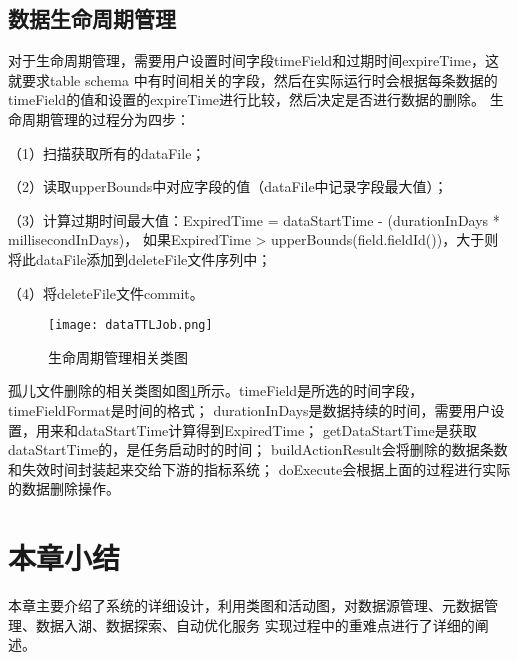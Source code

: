 \subsection{数据生命周期管理}

对于生命周期管理，需要用户设置时间字段timeField和过期时间expireTime，这就要求table schema
中有时间相关的字段，然后在实际运行时会根据每条数据的timeField的值和设置的expireTime进行比较，然后决定是否进行数据的删除。
生命周期管理的过程分为四步：

（1）扫描获取所有的dataFile；

（2）读取upperBounds中对应字段的值（dataFile中记录字段最大值）；

（3）计算过期时间最大值：ExpiredTime = dataStartTime - (durationInDays * millisecondInDays)，
如果ExpiredTime > upperBounds(field.fieldId())，大于则将此dataFile添加到deleteFile文件序列中；

（4）将deleteFile文件commit。

\begin{figure}[H]
  \centering
  \texttt{[image: dataTTLJob.png]}
  \caption{生命周期管理相关类图}
  \label{fig:dataTTLJob}
\end{figure}

孤儿文件删除的相关类图如图\ref{fig:dataTTLJob}所示。timeField是所选的时间字段，timeFieldFormat是时间的格式；
durationInDays是数据持续的时间，需要用户设置，用来和dataStartTime计算得到ExpiredTime；
getDataStartTime是获取dataStartTime的，是任务启动时的时间；
buildActionResult会将删除的数据条数和失效时间封装起来交给下游的指标系统；
doExecute会根据上面的过程进行实际的数据删除操作。

\section{本章小结}

本章主要介绍了系统的详细设计，利用类图和活动图，对数据源管理、元数据管理、数据入湖、数据探索、自动优化服务
实现过程中的重难点进行了详细的阐述。
